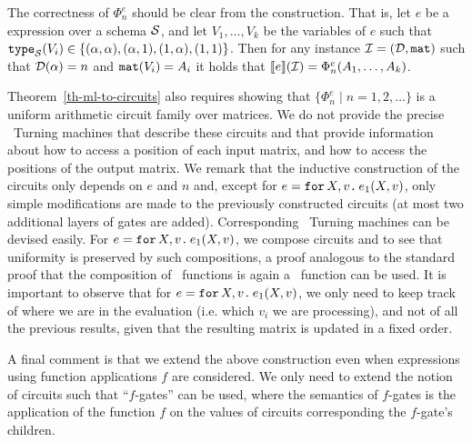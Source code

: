 The correctness of  $\Phi_n^e$ should be clear from the construction. That is, let $e$ be a \langfor expression over  a schema $\mathcal{S}$, and  let $V_1,\ldots ,V_k$ be the variables of $e$ such that $\texttt{type}_{\mathcal{S}}(V_i)\in \{(\alpha,\alpha),\allowbreak (\alpha,1), (1,\alpha), (1,1)\}$. Then 
for any instance $\mathcal{I} = (\mathcal{D},\texttt{mat})$ such that $\mathcal{D}(\alpha) = n$ and $\texttt{mat}(V_i) = A_i$ it holds that $\llbracket e \rrbracket(\mathcal{I}) = \Phi_n^e(A_1,\ldots ,A_k)$.

%
Theorem~\ref{th-ml-to-circuits} also requires showing that $\{\Phi_n^e \mid n=1,2,\ldots\}$ is a uniform arithmetic circuit family over matrices.
We do not provide the precise \logspace\ Turning machines that describe these circuits and that provide information about how to access a position of each input matrix, and how to access the positions of the output matrix. We remark that the inductive construction of the circuits only depends on $e$ and $n$ and,
except for  $e=\texttt{for}\, X,v \texttt{.}\, e_1(X, v)$, only simple modifications are made to the previously constructed circuits (at most two additional layers of gates are added).
Corresponding  \logspace\ Turning machines can be devised easily. For  $e=\texttt{for}\, X,v \texttt{.}\, e_1(X, v)$, we compose circuits and to see that uniformity is preserved by such compositions, a proof analogous to the standard proof that the composition of \logspace\ functions is again a \logspace\ function  \cite{aroraB2009} can be used. It is important to observe that for $e=\texttt{for}\, X,v \texttt{.}\, e_1(X, v)$, we only need to keep track of where we are in the evaluation (i.e. which $v_i$ we are processing), and not of all the previous results, given that the resulting matrix is updated in a fixed order.

A final comment is that we extend the above construction even when \langfor expressions using function applications $f$ are considered. We only need to extend
the notion of circuits such that ``$f$-gates'' can be used, where the semantics of $f$-gates is the application of the function $f$ on the values of circuits
corresponding the $f$-gate's children.

